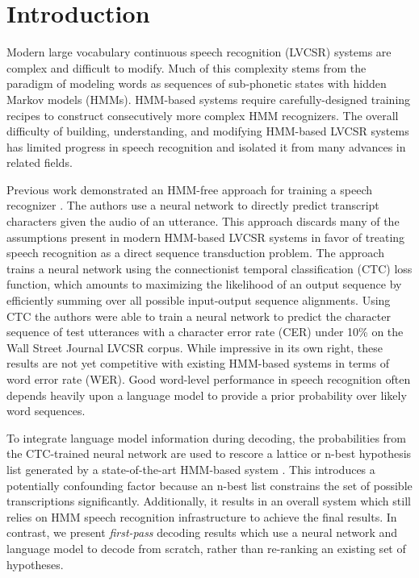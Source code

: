 \section{Introduction}
\label{sec:first_pass:introduction}

Modern large vocabulary continuous speech recognition (LVCSR) systems are
complex and difficult to modify. Much of this complexity stems from the
paradigm of modeling words as sequences of sub-phonetic states with hidden
Markov models (HMMs). HMM-based systems require carefully-designed training
recipes to construct consecutively more complex HMM recognizers. The overall
difficulty of building, understanding, and modifying HMM-based LVCSR systems
has limited progress in speech recognition and isolated it from many advances
in related fields. 

Previous work demonstrated an HMM-free approach for training a speech
recognizer \cite{graves2014}. The authors use a neural network to directly
predict transcript characters given the audio of an utterance. This approach
discards many of the assumptions present in modern HMM-based LVCSR systems in
favor of treating speech recognition as a direct sequence transduction problem.
The approach trains a neural network using the connectionist temporal
classification (CTC) loss function, which amounts to maximizing the likelihood
of an output sequence by efficiently summing over all possible input-output
sequence alignments.  Using CTC the authors were able to train a neural network
to predict the character sequence of test utterances with a character error
rate (CER) under 10\% on the Wall Street Journal LVCSR corpus. While impressive
in its own right, these results are not yet competitive with existing HMM-based
systems in terms of word error rate (WER). Good word-level performance in
speech recognition often depends heavily upon a language model to provide a
prior probability over likely word sequences. 

To integrate language model information during decoding, the probabilities from
the CTC-trained neural network are used to rescore a lattice or n-best
hypothesis list generated by a state-of-the-art HMM-based system
\cite{graves2014}. This introduces a potentially confounding factor because an
n-best list constrains the set of possible transcriptions significantly.
Additionally, it results in an overall system which still relies on HMM speech
recognition infrastructure to achieve the final results. In contrast, we
present \emph{first-pass} decoding results which use a neural network and
language model to decode from scratch, rather than re-ranking an existing set
of hypotheses.

